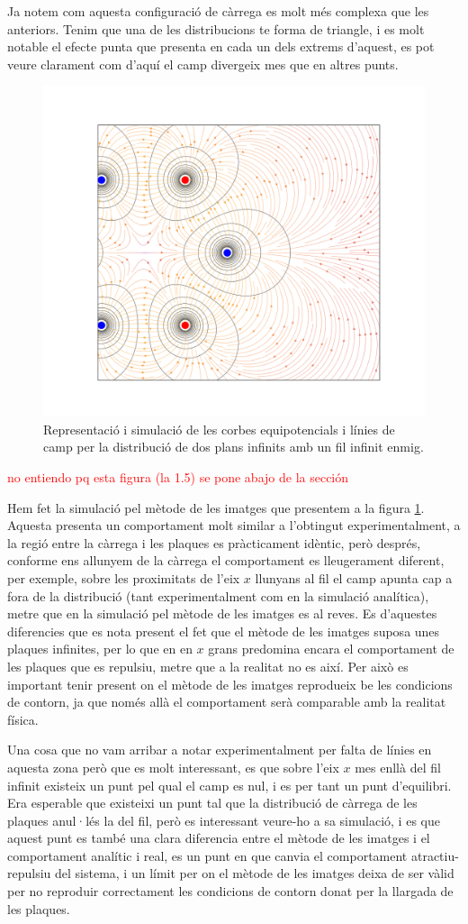 \documentclass[a4paper,10.5pt]{report}
\begin{document}
Ja notem com aquesta configuració de càrrega es molt més complexa que les anteriors. Tenim que una de les distribucions te forma de triangle, i es molt notable el efecte punta que presenta en cada un dels extrems d'aquest, es pot veure clarament com d'aquí el camp divergeix mes que en altres punts.

\begin{figure}[h]
	\centering
	\includegraphics[width=0.49\linewidth]{figV2imagenes}
	\caption{Representació i simulació de les corbes equipotencials i línies de camp per la distribució de dos plans infinits amb un fil infinit enmig.}
	\label{fig:1.5}
\end{figure}
\textcolor{red}{no entiendo pq esta figura (la 1.5) se pone abajo de la sección}

Hem fet la simulació pel mètode de les imatges que presentem a la figura \ref{fig:1.5}. Aquesta presenta un comportament molt similar a l'obtingut experimentalment, a la regió entre la càrrega i les plaques es pràcticament idèntic, però després, conforme ens allunyem de la càrrega el comportament es lleugerament diferent, per exemple, sobre les proximitats de l'eix $x$ llunyans al fil el camp apunta cap a fora de la distribució (tant experimentalment com en la simulació analítica), metre que en la simulació pel mètode de les imatges es al reves. Es d'aquestes diferencies que es nota present el fet que el mètode de les imatges suposa unes plaques infinites, per lo que en en $x$ grans predomina encara el comportament de les plaques que es repulsiu, metre que a la realitat no es així. Per això es important tenir present on el mètode de les imatges reprodueix be les condicions de contorn, ja que només allà el comportament serà comparable amb la realitat física. 

Una cosa que no vam arribar a notar experimentalment per falta de línies en aquesta zona però que es molt interessant, es que sobre l'eix $x$ mes enllà del fil infinit existeix un punt pel qual el camp es nul, i es per tant un punt d'equilibri. Era esperable que existeixi un punt tal que la distribució de càrrega de les plaques anul·lés la del fil, però es interessant veure-ho a sa simulació, i es que aquest punt es també una clara diferencia entre el mètode de les imatges i el comportament analític i real, es un punt en que canvia el comportament atractiu-repulsiu del sistema, i un límit per on el mètode de les imatges deixa de ser vàlid per no reproduir correctament les condicions de contorn donat per la llargada de les plaques. \\
\end{document}
